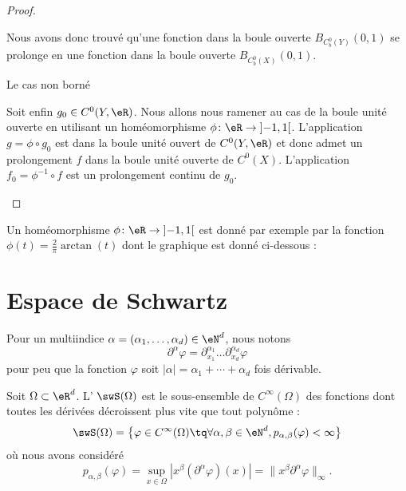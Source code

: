 \begin{proof}
\begin{subproof}
    Nous avons donc trouvé qu'une fonction dans la boule ouverte \( B_{C^0_b(Y)}(0,1)\) se prolonge en une fonction dans la boule ouverte \( B_{C^0_b(X)}(0,1)\).

\item[Le cas non borné]

Soit enfin \( g_0\in C^0(Y,\eR)\). Nous allons nous ramener au cas de la boule unité ouverte en utilisant un homéomorphisme \( \phi\colon \eR\to \mathopen] -1 , 1 \mathclose[\). L'application \( g=\phi\circ g_0\) est dans la boule unité ouvert de \( C^0(Y,\eR)\) et donc admet un prolongement \( f\) dans la boule unité ouverte de \( C^0(X)\). L'application \( f_0=\phi^{-1}\circ f\) est un prolongement continu de \( g_0\).

    \end{subproof}
\end{proof}

Un homéomorphisme \( \phi\colon \eR\to \mathopen] -1 , 1 \mathclose[\) est donné par exemple par la fonction \( \phi(t)=\frac{ 2 }{ \pi }\arctan(t)\) dont le graphique est donné ci-dessous :
\begin{center}
    
\end{center}

\section{Espace de Schwartz}

Pour un multiindice \( \alpha=(\alpha_1,\ldots, \alpha_d)\in \eN^d\), nous notons
\begin{equation}
    \partial^{\alpha}\varphi=\partial_{x_1}^{\alpha_1}\ldots\partial_{x_d}^{\alpha_d}\varphi
\end{equation}
pour peu que la fonction \( \varphi\) soit \( | \alpha |=\alpha_1+\cdots +\alpha_d\) fois dérivable.

\begin{definition}  \label{DefHHyQooK}
    Soit \( \Omega\subset\eR^d\). L' \( \swS(\Omega)\) est le sous-ensemble de \(  C^{\infty}(\Omega)\) des fonctions dont toutes les dérivées décroissent plus vite que tout polynôme :
    \begin{equation}
        \swS(\Omega)=\big\{   \varphi\in C^{\infty}(\Omega)\tq\forall \alpha,\beta\in \eN^d, p_{\alpha,\beta}(\varphi)<\infty   \big\}
    \end{equation}
    où nous avons considéré
    \begin{equation}    \label{EqOWdChCu}
        p_{\alpha,\beta}(\varphi)=\sup_{x\in \Omega}| x^{\beta}(\partial^{\alpha}\varphi)(x) |=\| x^{\beta}\partial^{\alpha}\varphi \|_{\infty}.
    \end{equation}
\end{definition}

